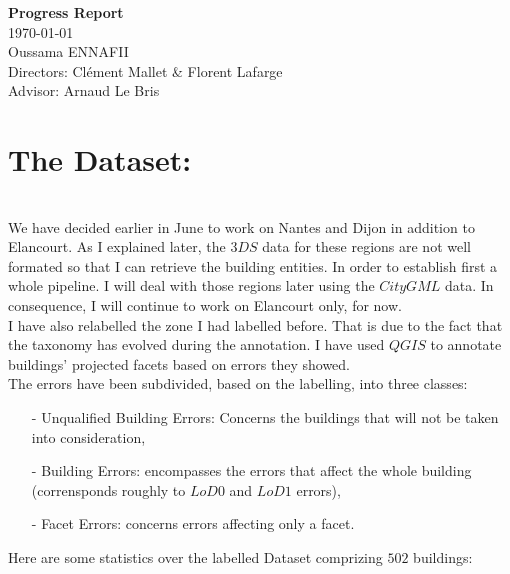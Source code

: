 \documentclass[a4paper, 11pt]{article}
\begin{document}
	\begin{centering}
		\Large{\textbf{Progress Report}}\\
		\large{\today}
~\\
		Oussama ENNAFII\\
		Directors: Cl\'ement Mallet \& Florent Lafarge \\
		Advisor: Arnaud Le Bris \\

	\end{centering}


	\section{The Dataset:}
~\\

	We have decided earlier in June to work on Nantes and Dijon in addition to
	Elancourt. As I explained later, the $3DS$ data for these regions are not
	well formated so that I can retrieve the building entities. In order to
	establish first a whole pipeline. I will deal with those regions later using
	the $CityGML$ data. In consequence, I will continue to work on Elancourt
	only, for now.\\

	I have also relabelled the zone I had labelled before. That is due to the fact
	that the taxonomy has evolved during the annotation. I have used $QGIS$ to
	annotate buildings' projected facets based on errors they showed.\\

	The errors have been subdivided, based on the labelling, into three classes:

	\begin{itemize}
		\item[-] Unqualified Building Errors: Concerns the buildings that will not
		be taken into consideration,
		\item[-] Building Errors: encompasses the errors that affect the whole
		building (corrensponds roughly to $LoD0$ and $LoD1$ errors),
		\item[-] Facet Errors: concerns errors affecting only a facet.
	\end{itemize}

	Here are some statistics over the labelled Dataset comprizing $502$ buildings:
\end{document}
